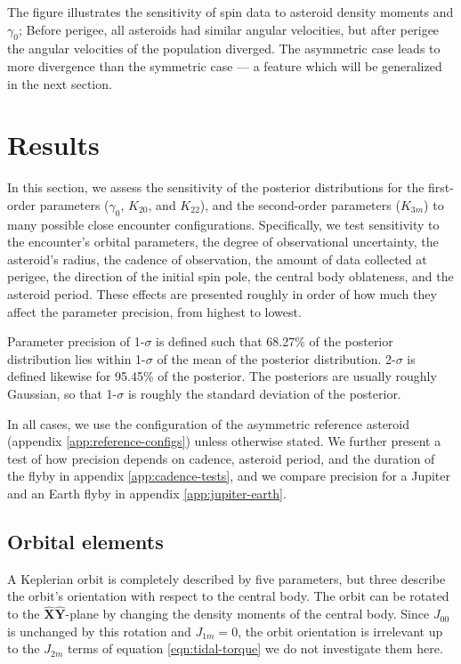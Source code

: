 \documentclass[fleqn,usenatbib]{mnras}
\newcommand{\unit}[1]{\bm{\hat{#1}}}
\begin{document}
The figure illustrates the sensitivity of spin data to asteroid density moments and $\gamma_0$; Before perigee, all asteroids had similar angular velocities, but after perigee the angular velocities of the population diverged. The asymmetric case leads to more divergence than the symmetric case --- a feature which will be generalized in the next section.




\section{Results}
\label{sec:results}

In this section, we assess the sensitivity of the posterior distributions for the first-order parameters ($\gamma_0$, $K_{20}$, and $K_{22}$), and the second-order parameters ($K_{3m}$) to many possible close encounter configurations. Specifically, we test sensitivity to the encounter's orbital parameters, the degree of observational uncertainty, the asteroid's radius, the cadence of observation, the amount of data collected at perigee, the direction of the initial spin pole, the central body oblateness, and the asteroid period. These effects are presented roughly in order of how much they affect the parameter precision, from highest to lowest.

Parameter precision of 1-$\sigma$ is defined such that 68.27\% of the posterior distribution lies within 1-$\sigma$ of the mean of the posterior distribution. 2-$\sigma$ is defined likewise for 95.45\% of the posterior. The posteriors are usually roughly Gaussian, so that 1-$\sigma$ is roughly the standard deviation of the posterior.

In all cases, we use the configuration of the asymmetric reference asteroid (appendix \ref{app:reference-configs}) unless otherwise stated. We further present a test of how precision depends on cadence, asteroid period, and the duration of the flyby in appendix \ref{app:cadence-tests}, and we compare precision for a Jupiter and an Earth flyby in appendix \ref{app:jupiter-earth}.


\subsection{Orbital elements}
\label{sec:scan-orbit}
A Keplerian orbit is completely described by five parameters, but three describe the orbit's orientation with respect to the central body. The orbit can be rotated to the $\unit X \unit Y$-plane by changing the density moments of the central body. Since $J_{00}$ is unchanged by this rotation and $J_{1m}=0$, the orbit orientation is irrelevant up to the $J_{2m}$ terms of equation \ref{eqn:tidal-torque} we do not investigate them here.
\end{document}
